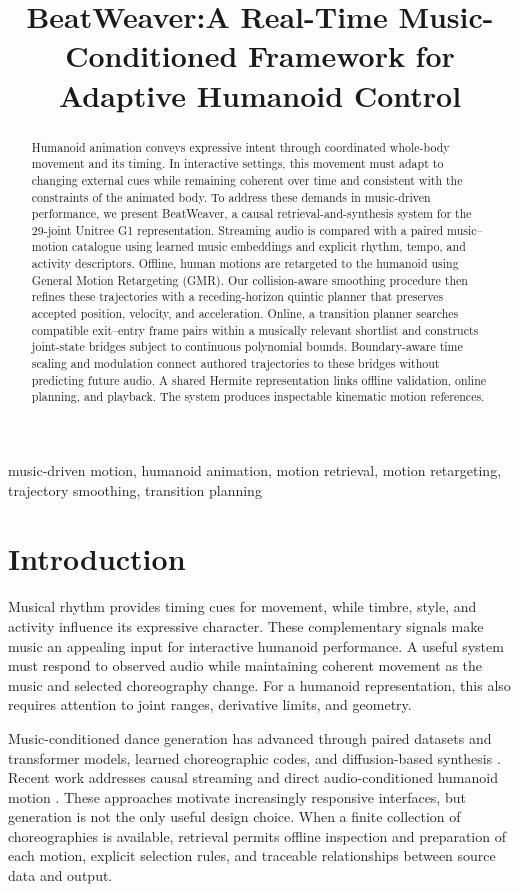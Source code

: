 \documentclass[conference]{IEEEtran}
\title{BeatWeaver:A Real-Time Music-Conditioned Framework for Adaptive Humanoid Control}
\author{\IEEEauthorblockN{Chengjun Ouyang}
\IEEEauthorblockA{University College London\\London, United Kingdom}}
\begin{document}
\maketitle
\begin{abstract}
Humanoid animation conveys expressive intent through coordinated whole-body
movement and its timing. In interactive settings, this movement must adapt to
changing external cues while remaining coherent over time and consistent with
the constraints of the animated body. To address these demands in music-driven
performance, we present BeatWeaver, a causal retrieval-and-synthesis system for
the 29-joint Unitree G1 representation. Streaming audio is compared
with a paired music--motion catalogue using learned music embeddings and
explicit rhythm, tempo, and activity descriptors. Offline, human motions are
retargeted to the humanoid using General Motion Retargeting (GMR). Our
collision-aware smoothing procedure then refines these trajectories with a
receding-horizon quintic planner that preserves accepted position, velocity,
and acceleration. Online, a transition planner searches compatible exit--entry
frame pairs within a musically relevant shortlist and constructs joint-state
bridges subject to continuous polynomial bounds. Boundary-aware time scaling
and modulation connect authored trajectories to these bridges without
predicting future audio. A shared Hermite representation links offline
validation, online planning, and playback. The system produces inspectable
kinematic motion references.
\end{abstract}
\begin{IEEEkeywords}
music-driven motion, humanoid animation, motion retrieval, motion retargeting,
trajectory smoothing, transition planning
\end{IEEEkeywords}

\section{Introduction}
Musical rhythm provides timing cues for movement, while timbre, style, and
activity influence its expressive character. These complementary signals make
music an appealing input for interactive humanoid performance. A useful system
must respond to observed audio while maintaining coherent movement as the
music and selected choreography change. For a humanoid representation, this
also requires attention to joint ranges, derivative limits, and geometry.

Music-conditioned dance generation has advanced through paired datasets and
transformer models, learned choreographic codes, and diffusion-based synthesis
\cite{li2021ai,siyao2022bailando,tseng2023edge}. Recent work addresses causal
streaming and direct audio-conditioned humanoid motion
\cite{ji2026discoforcing,li2026you}. These approaches motivate increasingly
responsive interfaces, but generation is not the only useful design choice.
When a finite collection of choreographies is available, retrieval permits
offline inspection and preparation of each motion, explicit selection rules,
and traceable relationships between source data and output.
\end{document}

